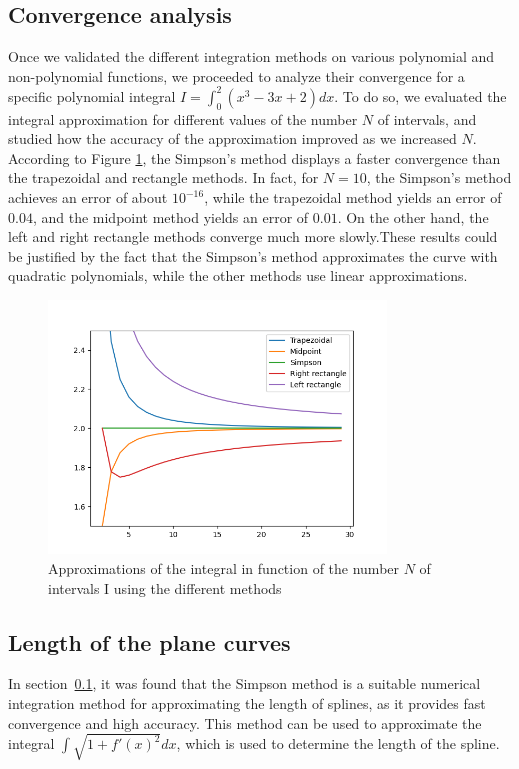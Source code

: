 \subsection{Convergence analysis}
\label{section}
Once we validated the different integration methods on various polynomial and non-polynomial functions, we proceeded to analyze their convergence for a specific polynomial integral $ I = \int_{0}^{2}(x^{3} -3x +2)dx$. To do so, we evaluated the integral approximation for different values of the number $N$ of intervals, and studied how the accuracy of the approximation improved as we increased $N$. \\
According to Figure \ref{fig:speed}, the Simpson's method displays a faster convergence than the trapezoidal and rectangle methods. In fact, for $N=10$, the Simpson's method achieves an error of about $10^{-16}$, while the trapezoidal method yields an error of $0.04$, and the midpoint method yields an error of $0.01$. On the other hand, the left and right rectangle methods converge much more slowly.These results could be justified by the fact that the Simpson's method approximates the curve with quadratic polynomials, while the other methods use linear approximations.\\
\begin{figure}[H]
  \centering
  \includegraphics[width=0.8\textwidth]{img/speed_convergence.png}
  \caption{Approximations of the integral in function of the number $N$ of intervals I using the different methods}
  \label{fig:speed}
\end{figure}

\subsection{Length of the plane curves} 
In section~\ref{section}, it was found that the Simpson method is a suitable numerical integration method for approximating the length of splines, as it provides fast convergence and high accuracy. This method can be used to approximate the integral $\int \sqrt{1+f'(x)^{2}}dx$, which is used to determine the length of the spline.

